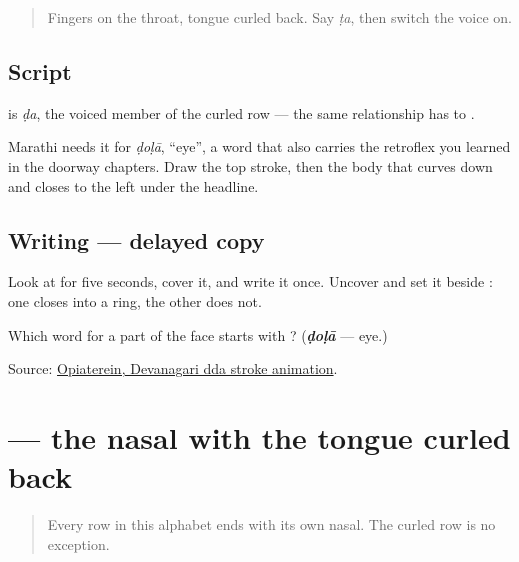 \label{lesson:MR-W07-dda}



\begin{quote}
Fingers on the throat, tongue curled back. Say \emph{ṭa}, then switch the voice on.
\end{quote}

\subsection*{Script}
\begin{quote}
\end{quote}

\textbf{} is \emph{ḍa}, the voiced member of the curled row — the same relationship \textbf{} has to \textbf{}.

Marathi needs it for \emph{ḍoḷā}, \textquotedblleft{}eye\textquotedblright{}, a word that also carries the retroflex \textbf{} you learned in the doorway chapters. Draw the top stroke, then the body that curves down and closes to the left under the headline.

\subsection*{Writing — delayed copy}

Look at \textbf{} for five seconds, cover it, and write it once. Uncover and set it beside \textbf{}: one closes into a ring, the other does not.

\begin{tcolorbox}[breakable,colback=teal!4,colframe=teal!35!black,title={Before you move on}]
Which word for a part of the face starts with \textbf{}? (\emph{\textbf{ḍoḷā}} — eye.)

Source: \href{https://commons.wikimedia.org/wiki/File:Deva-\%E0\%A4\%A1-order.gif}{Opiaterein, Devanagari dda stroke animation}.
\end{tcolorbox}
\section[\texorpdfstring{\mr{ण} (ṇa)}{ण (ṇa)}]{ — the nasal with the tongue curled back}

\label{lesson:MR-W07-nna}



\begin{quote}
Every row in this alphabet ends with its own nasal. The curled row is no exception.
\end{quote}

